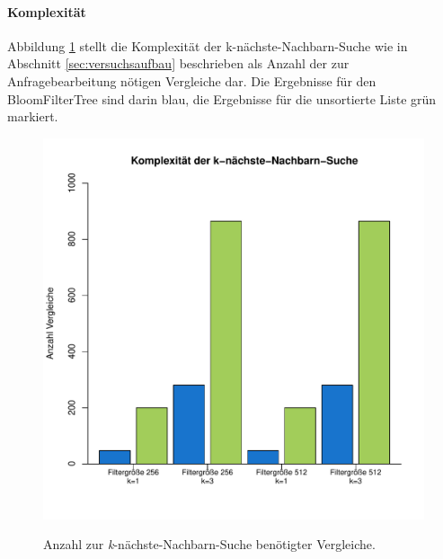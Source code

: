 \paragraph*{Komplexität}
Abbildung \ref{fig:pic18} stellt die Komplexität der k-nächste-Nachbarn-Suche wie in Abschnitt \ref{sec:versuchsaufbau} beschrieben als Anzahl der zur Anfragebearbeitung nötigen Vergleiche dar. Die Ergebnisse für den BloomFilterTree sind darin blau, die Ergebnisse für die unsortierte Liste grün markiert.
\begin{figure}[hptb]
	\centering
	\includegraphics[scale=0.7]{pictures/compl.pdf}\\
	\caption[Anzahl zur \textit{k}-nächste-Nachbarn-Suche benötigter Vergleiche]{Anzahl zur \textit{k}-nächste-Nachbarn-Suche benötigter Vergleiche.}\label{fig:pic18}
\end{figure} 
